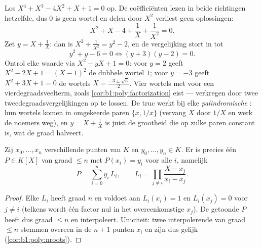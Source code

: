 \begin{example}\label{ex:b1:poly:palindrome}
Los $X^4 + X^3 - 4X^2 + X + 1 = 0$ op. De coëfficiënten lezen in beide
richtingen hetzelfde, dus $0$ is geen wortel en delen door $X^2$ verliest
geen oplossingen:
\[
X^2 + X - 4 + \frac1X + \frac1{X^2} = 0 .
\]
Zet $y = X + \frac1X$: dan is $X^2 + \frac1{X^2} = y^2 - 2$, en de
vergelijking stort in tot
\[
y^2 + y - 6 = 0 \iff (y + 3)(y - 2) = 0 .
\]
Ontrol elke waarde via $X^2 - yX + 1 = 0$: voor $y = 2$ geeft $X^2 - 2X +
1 = (X - 1)^2$ de dubbele wortel $1$; voor $y = -3$ geeft $X^2 + 3X + 1 =
0$ de wortels $X = \frac{-3 \pm \sqrt5}2$. Vier wortels met
 voor een vierdegraadsveelterm, zoals
\cref{cor:b1:poly:factorization} eist --- verkregen door twee
tweedegraadsvergelijkingen op te lossen. De truc werkt bij elke
\emph{palindromische} : hun wortels komen in omgekeerde paren
$\{x, 1/x\}$ (vervang $X$ door $1/X$ en werk de noemers weg), en $y = X +
\frac1X$ is juist de grootheid die op zulke paren constant is, wat de
graad halveert.
\end{example}

\begin{theorem}\label{thm:b1:poly:lagrange}
Zij $x_0, \dots, x_n$ verschillende punten van $K$ en $y_0, \dots, y_n
\in K$. Er is precies één $P \in K[X]$ van graad $\leq n$ met $P(x_i) =
y_i$ voor alle $i$, namelijk
\[
P = \sum_{i=0}^{n} y_i\, L_i,
\qquad
L_i = \prod_{j \neq i} \frac{X - x_j}{x_i - x_j} .
\]
\end{theorem}

\begin{proof}
Elke $L_i$ heeft graad $n$ en voldoet aan $L_i(x_i) = 1$ en $L_i(x_j) =
0$ voor $j \neq i$ (telkens wordt één factor nul in het overeenkomstige
$x_j$). De getoonde $P$ heeft dus graad $\leq n$ en interpoleert.
Uniciteit: twee interpolerende  van graad $\leq n$ stemmen
overeen in de $n+1$ punten $x_i$ en zijn dus gelijk
(\cref{cor:b1:poly:nroots}).
\end{proof}


